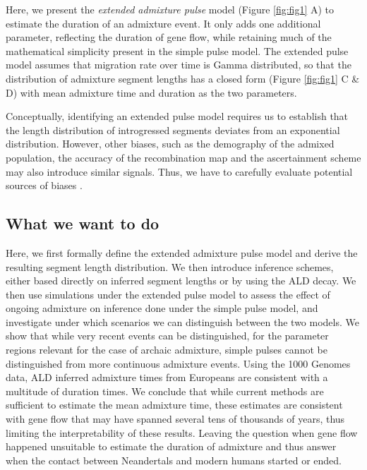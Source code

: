 \documentclass[]{article}
\begin{document}
Here, we present the \emph{extended admixture pulse} model (Figure \ref{fig:fig1} A) to estimate the duration of an admixture event. It only adds one additional parameter, reflecting the duration of gene flow, while retaining much of the mathematical simplicity present in the simple pulse model. 
The extended pulse model assumes that migration rate over time is Gamma distributed, so that the  distribution of admixture segment lengths has a closed form (Figure \ref{fig:fig1} C \& D) with mean admixture time and duration as the two parameters.

Conceptually, identifying an extended pulse model requires us to establish that the length distribution of introgressed segments deviates from an exponential distribution. However, other biases, such as the demography of the admixed population, the accuracy of the recombination map and the ascertainment scheme may also introduce similar signals. Thus, we have to carefully evaluate potential sources of biases  \citep{sankararaman_date_2012,fu_genome_2014,moorjani_genetic_2016}. 


\subsection{What we want to do}\label{what-we-want-to-do}

Here, we first formally define the extended admixture pulse model and derive the resulting segment length distribution. We then introduce inference schemes, either based directly on inferred segment lengths or by using the ALD decay. 
We then use simulations under the extended pulse model to assess the effect of ongoing admixture on inference done under the simple pulse model, and investigate under which scenarios we can distinguish between the two models. We show that while very recent events can be distinguished, for the parameter regions relevant for the  case of archaic admixture, simple pulses cannot be distinguished from more continuous admixture events. Using the 1000 Genomes data, ALD inferred admixture times from Europeans are consistent with a multitude of duration times.
We conclude that while current methods are sufficient to estimate the mean admixture time, these estimates are consistent with gene flow that may have spanned several tens of thousands of years, thus limiting the interpretability of these results. Leaving the question when gene flow happened unsuitable to estimate the duration of admixture and thus answer when the contact between Neandertals and modern humans started or ended.
\end{document}

